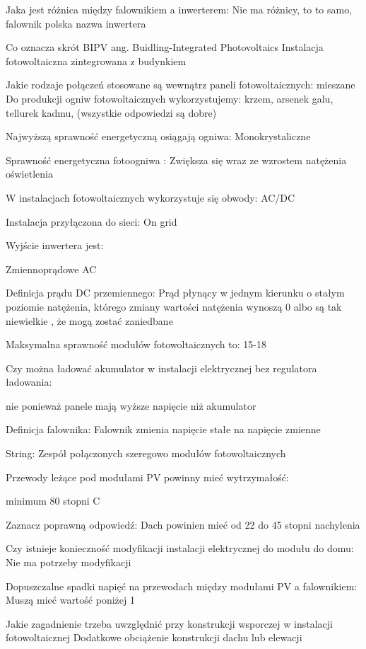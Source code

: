 \documentclass{article}
\begin{document}
Jaka jest różnica między falownikiem a inwerterem:
Nie ma różnicy, to to samo, falownik polska nazwa inwertera

Co oznacza skrót BIPV ang. Buidling-Integrated Photovoltaics
Instalacja fotowoltaiczna zintegrowana z budynkiem

Jakie rodzaje połączeń stosowane są wewnątrz paneli fotowoltaicznych:
mieszane
Do produkcji ogniw fotowoltaicznych wykorzystujemy:
krzem, arsenek galu, tellurek kadmu, (wszystkie odpowiedzi są dobre)

Najwyższą sprawność energetyczną osiągają ogniwa:
Monokrystaliczne

Sprawność energetyczna fotoogniwa :
Zwiększa się wraz ze wzrostem natężenia oświetlenia

W instalacjach fotowoltaicznych wykorzystuje się obwody:
AC/DC

Instalacja przyłączona do sieci:
On grid

Wyjście inwertera jest:

Zmiennoprądowe AC

Definicja prądu DC przemiennego:
Prąd płynący w jednym kierunku o stałym poziomie natężenia, którego zmiany wartości natężenia wynoszą 0 albo są tak niewielkie , że mogą zostać zaniedbane

Maksymalna sprawność modułów fotowoltaicznych to:
15-18%

Czy można ładować akumulator w instalacji elektrycznej bez regulatora ładowania:

nie ponieważ panele mają wyższe napięcie niż akumulator

Definicja falownika:
Falownik zmienia napięcie stałe na napięcie zmienne

String:
Zespół połączonych szeregowo modułów fotowoltaicznych

Przewody leżące pod modułami PV powinny mieć wytrzymałość:

 minimum 80 stopni C

Zaznacz poprawną odpowiedź:
Dach powinien mieć od 22 do 45 stopni nachylenia

Czy istnieje konieczność modyfikacji instalacji elektrycznej do modułu do domu:
Nie ma potrzeby modyfikacji

Dopuszczalne spadki napięć na przewodach między modułami PV a falownikiem:
Muszą mieć wartość poniżej 1%

Jakie zagadnienie trzeba uwzględnić przy konstrukcji wsporczej w instalacji fotowoltaicznej 
Dodatkowe obciążenie konstrukcji dachu lub elewacji
\end{document}
